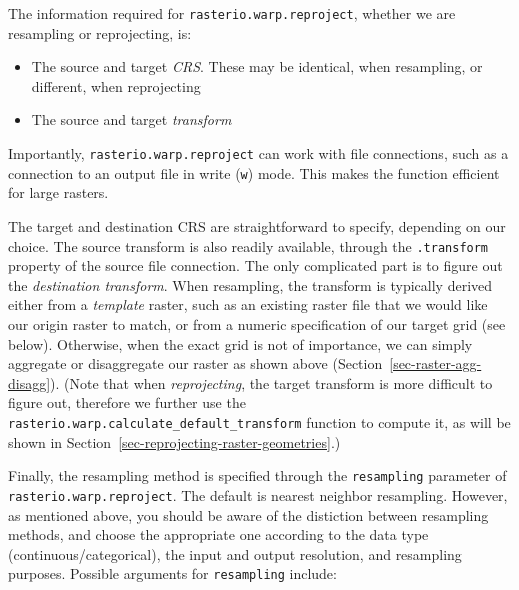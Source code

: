 \documentclass[
  letterpaper,
]{krantz}
\providecommand{\tightlist}{%
  \setlength{\itemsep}{0pt}\setlength{\parskip}{0pt}}\usepackage{longtable,booktabs,array}
\begin{document}
The information required for \texttt{rasterio.warp.reproject}, whether
we are resampling or reprojecting, is:

\begin{itemize}
\tightlist
\item
  The source and target \emph{CRS}. These may be identical, when
  resampling, or different, when reprojecting
\item
  The source and target \emph{transform}
\end{itemize}

Importantly, \texttt{rasterio.warp.reproject} can work with file
connections, such as a connection to an output file in write
(\texttt{\textquotesingle{}w\textquotesingle{}}) mode. This makes the
function efficient for large rasters.

The target and destination CRS are straightforward to specify, depending
on our choice. The source transform is also readily available, through
the \texttt{.transform} property of the source file connection. The only
complicated part is to figure out the \emph{destination transform}. When
resampling, the transform is typically derived either from a
\emph{template} raster, such as an existing raster file that we would
like our origin raster to match, or from a numeric specification of our
target grid (see below). Otherwise, when the exact grid is not of
importance, we can simply aggregate or disaggregate our raster as shown
above (Section~\ref{sec-raster-agg-disagg}). (Note that when
\emph{reprojecting}, the target transform is more difficult to figure
out, therefore we further use the
\texttt{rasterio.warp.calculate\_default\_transform} function to compute
it, as will be shown in
Section~\ref{sec-reprojecting-raster-geometries}.)

Finally, the resampling method is specified through the
\texttt{resampling} parameter of \texttt{rasterio.warp.reproject}. The
default is nearest neighbor resampling. However, as mentioned above, you
should be aware of the distiction between resampling methods, and choose
the appropriate one according to the data type (continuous/categorical),
the input and output resolution, and resampling purposes. Possible
arguments for \texttt{resampling} include:
\end{document}
